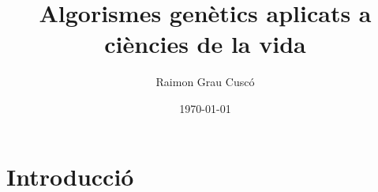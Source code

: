 \documentclass{beamer}
\begin{document}
\title{Algorismes genètics aplicats a ciències de la vida}
\author{Raimon Grau Cuscó}
\date{\today}


\frame{\titlepage} 




\section{Introducció} %
\end{document}
